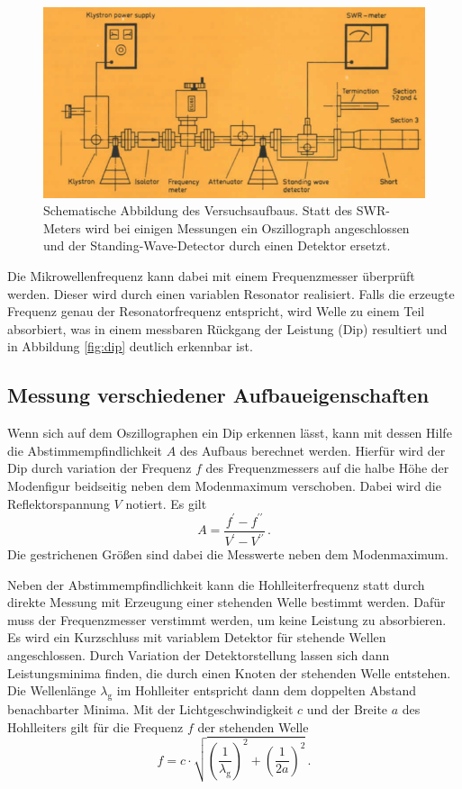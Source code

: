 \begin{figure}[p]
    \centering
    \includegraphics[width=0.8\linewidth]{img/aufbau_microwave.png}
    \caption{
        Schematische Abbildung des Versuchsaufbaus. Statt des
        SWR-Meters wird bei einigen Messungen ein Oszillograph angeschlossen
        und der Standing-Wave-Detector durch einen Detektor ersetzt.
    }
    \label{fig:aufbau_microwave}
\end{figure}
Die Mikrowellenfrequenz kann dabei mit einem Frequenzmesser überprüft werden.
Dieser wird durch einen variablen Resonator realisiert. Falls die
erzeugte Frequenz genau der Resonatorfrequenz entspricht, wird Welle zu einem
Teil absorbiert, was in einem messbaren Rückgang der Leistung (Dip)
resultiert und in Abbildung \ref{fig:dip} deutlich erkennbar ist.

\subsection{Messung verschiedener Aufbaueigenschaften}
\label{subsec:messung}
Wenn sich auf dem Oszillographen ein Dip erkennen lässt, kann mit dessen Hilfe
die Abstimmempfindlichkeit $A$ des Aufbaus berechnet werden.
Hierfür wird der Dip durch variation der Frequenz $f$ des Frequenzmessers auf
die halbe Höhe der Modenfigur beidseitig neben dem Modenmaximum verschoben.
Dabei wird die Reflektorspannung $V$ notiert.
Es gilt
\begin{equation}
    \label{eqn:empfindlichkeit}
    A = \frac{f^\prime - f^{\prime\prime}}{V^\prime - V^{\prime\prime}}\,.
\end{equation}
Die gestrichenen Größen sind dabei die Messwerte neben dem Modenmaximum.

Neben der Abstimmempfindlichkeit kann die Hohlleiterfrequenz statt durch
direkte Messung mit Erzeugung einer stehenden Welle bestimmt werden.
Dafür muss der Frequenzmesser verstimmt werden, um keine Leistung zu
absorbieren.
Es wird ein Kurzschluss mit variablem Detektor für stehende Wellen
angeschlossen.
Durch Variation der Detektorstellung lassen sich dann Leistungsminima finden,
die durch einen Knoten der stehenden Welle entstehen.
Die Wellenlänge $\lambda_\text{g}$ im Hohlleiter entspricht dann dem doppelten
Abstand benachbarter Minima. Mit der Lichtgeschwindigkeit $c$
und der Breite $a$ des Hohlleiters gilt für die Frequenz $f$ der stehenden
Welle
\begin{equation}
    \label{frequenz}
    f = c\cdot\sqrt{\left(\frac{1}{\lambda_\text{g}}\right)^2 + \left(\frac{1}{2a}\right)^2} \,.
\end{equation}

\clearpage
